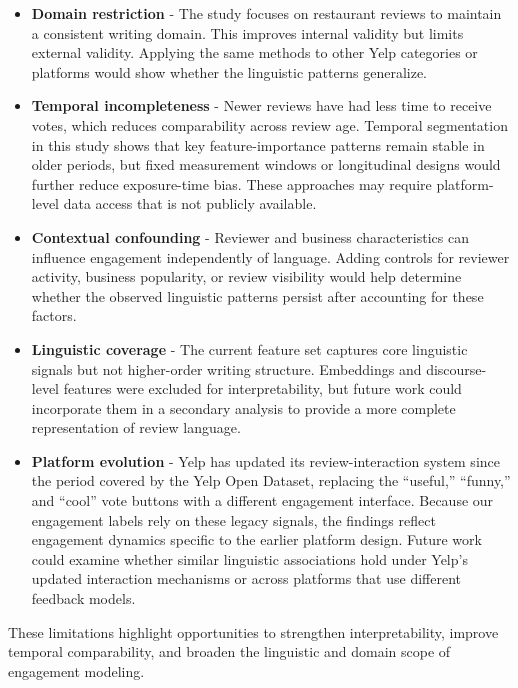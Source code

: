 \documentclass[12pt]{article}
\begin{document}
\begin{itemize} 

\item  \textbf{Domain restriction} -  The study focuses on restaurant reviews to maintain a consistent writing domain. This improves internal validity but limits external validity. Applying the same methods to other Yelp categories or platforms would show whether the linguistic patterns generalize.

\item  \textbf{Temporal incompleteness} - Newer reviews have had less time to receive votes, which reduces comparability across review age. Temporal segmentation in this study shows that key feature-importance patterns remain stable in older periods, but fixed measurement windows or longitudinal designs would further reduce exposure-time bias. These approaches may require platform-level data access that is not publicly available.

\item  \textbf{Contextual confounding} -  Reviewer and business characteristics can influence engagement independently of language. Adding controls for reviewer activity, business popularity, or review visibility would help determine whether the observed linguistic patterns persist after accounting for these factors.

\item  \textbf{Linguistic coverage} -  The current feature set captures core linguistic signals but not higher-order writing structure. Embeddings and discourse-level features were excluded for interpretability, but future work could incorporate them in a secondary analysis to provide a more complete representation of review language.

\item  \textbf{Platform evolution} - Yelp has updated its review-interaction system since the period covered by the Yelp Open Dataset, replacing the “useful,” “funny,” and “cool” vote buttons with a different engagement interface. Because our engagement labels rely on these legacy signals, the findings reflect engagement dynamics specific to the earlier platform design. Future work could examine whether similar linguistic associations hold under Yelp's updated interaction mechanisms or across platforms that use different feedback models.

\end{itemize}

These limitations highlight opportunities to strengthen interpretability, improve temporal comparability, and broaden the linguistic and domain scope of engagement modeling.
\end{document}
